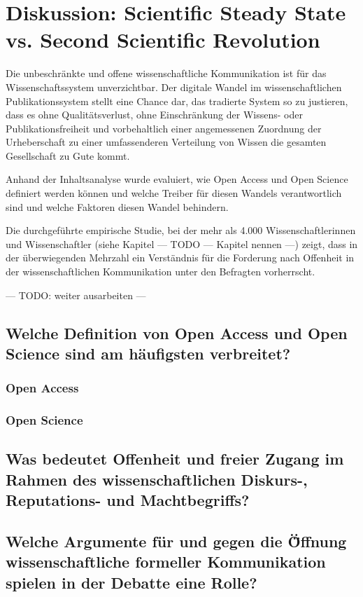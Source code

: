 \chapter{Diskussion: Scientific Steady State vs. Second Scientific Revolution}

Die unbeschränkte und offene wissenschaftliche Kommunikation ist für das Wissenschaftssystem unverzichtbar. Der digitale Wandel im wissenschaftlichen Publikationssystem stellt eine Chance dar, das tradierte System so zu justieren, dass es ohne Qualitätsverlust, ohne Einschränkung der Wissens- oder Publikationsfreiheit und vorbehaltlich einer angemessenen Zuordnung der Urheberschaft zu einer umfassenderen Verteilung von Wissen die gesamten Gesellschaft zu Gute kommt.

Anhand der Inhaltsanalyse wurde evaluiert, wie Open Access und Open Science definiert werden können und welche Treiber für diesen Wandels verantwortlich sind und welche Faktoren diesen Wandel behindern. 

Die durchgeführte empirische Studie, bei der mehr als 4.000 Wissenschaftlerinnen und Wissenschaftler (siehe Kapitel --- TODO --- Kapitel nennen ---) zeigt, dass in der überwiegenden Mehrzahl ein Verständnis für die Forderung nach Offenheit in der wissenschaftlichen Kommunikation unter den Befragten vorherrscht.

--- TODO: weiter ausarbeiten ---

\section{Welche Definition von Open Access und Open Science sind am häufigsten verbreitet?}  
\subsection{Open Access}  
\subsection{Open Science}  

\section{Was bedeutet Offenheit und freier Zugang im Rahmen des wissenschaftlichen Diskurs-, Reputations- und Machtbegriffs?} 

\section{Welche Argumente für und gegen die Ö̈ffnung wissenschaftliche formeller Kommunikation spielen in der Debatte eine Rolle?} 

